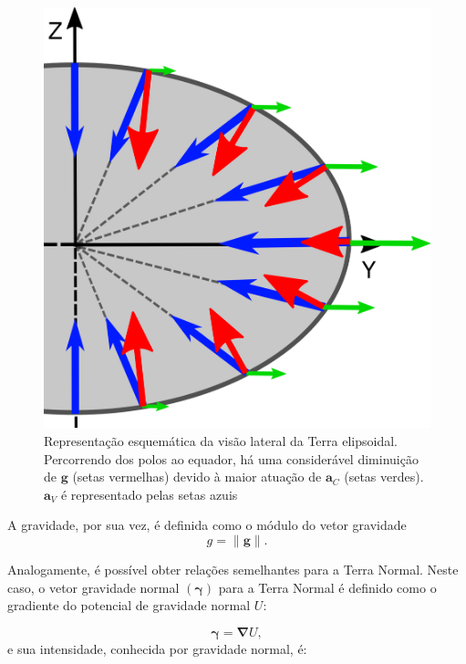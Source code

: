 \begin{figure}[!h]
	\centering
	\includegraphics[scale=0.3]{figs/vec.png}
	\caption{Representação esquemática da visão lateral da Terra elipsoidal. Percorrendo dos polos ao equador, há uma considerável diminuição de $\mathbf{g}$ (setas vermelhas) devido à maior atuação de $\mathbf{a}_C$ (setas verdes). $\mathbf{a}_V$ é representado pelas setas azuis}
	\label{fig:aceleracoes}
\end{figure}

A gravidade, por sua vez, é definida como o módulo do vetor gravidade
\begin{equation} \label{eq:gravidade_g}
\displaystyle {g = \parallel \mathbf{g} \parallel }.
\end{equation}

Analogamente, é possível obter relações semelhantes para a Terra Normal. Neste caso, o vetor gravidade normal $(\boldsymbol{\gamma})$ para a Terra Normal é definido como o gradiente do potencial de gravidade normal $U$:

\begin{equation} \label{eq:vec_gravidade_normal}
\displaystyle {\boldsymbol{\gamma} = \mathbf{\nabla} U  },
\end{equation} e sua intensidade, conhecida por gravidade normal, é:

